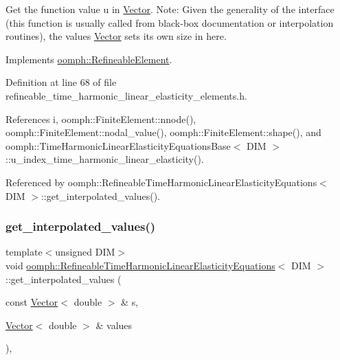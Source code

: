 Get the function value u in \hyperlink{classoomph_1_1Vector}{Vector}. Note\+: Given the generality of the interface (this function is usually called from black-\/box documentation or interpolation routines), the values \hyperlink{classoomph_1_1Vector}{Vector} sets its own size in here. 



Implements \hyperlink{classoomph_1_1RefineableElement_ada6f0efe831ffefb1d2829ce01d45bfc}{oomph\+::\+Refineable\+Element}.



Definition at line 68 of file refineable\+\_\+time\+\_\+harmonic\+\_\+linear\+\_\+elasticity\+\_\+elements.\+h.



References i, oomph\+::\+Finite\+Element\+::nnode(), oomph\+::\+Finite\+Element\+::nodal\+\_\+value(), oomph\+::\+Finite\+Element\+::shape(), and oomph\+::\+Time\+Harmonic\+Linear\+Elasticity\+Equations\+Base$<$ D\+I\+M $>$\+::u\+\_\+index\+\_\+time\+\_\+harmonic\+\_\+linear\+\_\+elasticity().



Referenced by oomph\+::\+Refineable\+Time\+Harmonic\+Linear\+Elasticity\+Equations$<$ D\+I\+M $>$\+::get\+\_\+interpolated\+\_\+values().

\mbox{\label{classoomph_1_1RefineableTimeHarmonicLinearElasticityEquations_aafadd0366ea9fab545ad59f80763d8e7}} 
\subsubsection{\texorpdfstring{get\+\_\+interpolated\+\_\+values()}{get\_interpolated\_values()}\hspace{0.1cm}{\footnotesize\ttfamily [2/2]}}
{\footnotesize\ttfamily template$<$unsigned D\+IM$>$ \\
void \hyperlink{classoomph_1_1RefineableTimeHarmonicLinearElasticityEquations}{oomph\+::\+Refineable\+Time\+Harmonic\+Linear\+Elasticity\+Equations}$<$ D\+IM $>$\+::get\+\_\+interpolated\+\_\+values (\begin{DoxyParamCaption}\item[{const \hyperlink{classoomph_1_1Vector}{Vector}$<$ double $>$ \&}]{s,  }\item[{\hyperlink{classoomph_1_1Vector}{Vector}$<$ double $>$ \&}]{values }\end{DoxyParamCaption})\hspace{0.3cm}{\ttfamily [inline]}, {\ttfamily [virtual]}}



